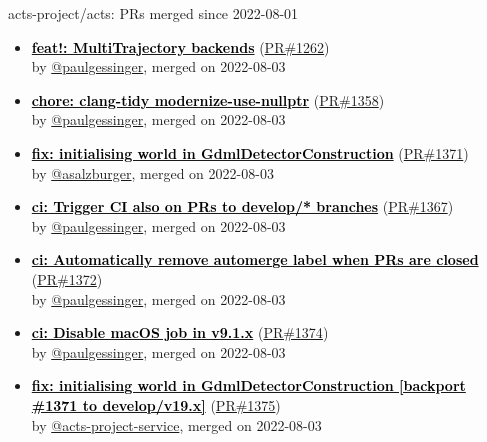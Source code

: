 \begin{frame}[allowframebreaks]{ acts-project/acts: PRs merged since 2022-08-01 }
\begin{itemize}
    \item
    \textbf{\href{https://github.com/acts-project/acts/pull/1262}{\textcolor{black}{feat!: MultiTrajectory backends}}}
    (\href{https://github.com/acts-project/acts/pull/1262}{PR\#1262}) \\
    by \href{https://github.com/paulgessinger}{ @paulgessinger}, merged on 2022-08-03

    \item
    \textbf{\href{https://github.com/acts-project/acts/pull/1358}{\textcolor{black}{chore: clang-tidy modernize-use-nullptr}}}
    (\href{https://github.com/acts-project/acts/pull/1358}{PR\#1358}) \\
    by \href{https://github.com/paulgessinger}{ @paulgessinger}, merged on 2022-08-03

    \item
    \textbf{\href{https://github.com/acts-project/acts/pull/1371}{\textcolor{black}{fix: initialising world in GdmlDetectorConstruction}}}
    (\href{https://github.com/acts-project/acts/pull/1371}{PR\#1371}) \\
    by \href{https://github.com/asalzburger}{ @asalzburger}, merged on 2022-08-03

    \item
    \textbf{\href{https://github.com/acts-project/acts/pull/1367}{\textcolor{black}{ci: Trigger CI also on PRs to develop/* branches}}}
    (\href{https://github.com/acts-project/acts/pull/1367}{PR\#1367}) \\
    by \href{https://github.com/paulgessinger}{ @paulgessinger}, merged on 2022-08-03

    \item
    \textbf{\href{https://github.com/acts-project/acts/pull/1372}{\textcolor{black}{ci: Automatically remove automerge label when PRs are closed}}}
    (\href{https://github.com/acts-project/acts/pull/1372}{PR\#1372}) \\
    by \href{https://github.com/paulgessinger}{ @paulgessinger}, merged on 2022-08-03

    \item
    \textbf{\href{https://github.com/acts-project/acts/pull/1374}{\textcolor{black}{ci: Disable macOS job in v9.1.x}}}
    (\href{https://github.com/acts-project/acts/pull/1374}{PR\#1374}) \\
    by \href{https://github.com/paulgessinger}{ @paulgessinger}, merged on 2022-08-03

    \item
    \textbf{\href{https://github.com/acts-project/acts/pull/1375}{\textcolor{black}{fix: initialising world in GdmlDetectorConstruction [backport \#1371 to develop/v19.x]}}}
    (\href{https://github.com/acts-project/acts/pull/1375}{PR\#1375}) \\
    by \href{https://github.com/acts-project-service}{ @acts-project-service}, merged on 2022-08-03


\end{itemize}
\end{frame}
